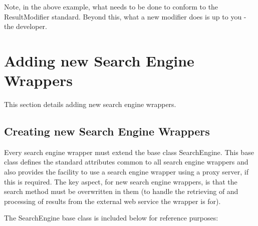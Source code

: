 \documentclass[letterpaper,10pt,english]{sphinxmanual}
\begin{document}
Note, in the above example, what needs to be done to conform to the ResultModifier standard. Beyond this, what a new modifier does is up to you - the developer.


\section{Adding new Search Engine Wrappers}
\label{extendingSearchEngine:extending-the-search-engine}\label{extendingSearchEngine::doc}\label{extendingSearchEngine:adding-new-search-engine-wrappers}
This section details adding new search engine wrappers.


\subsection{Creating new Search Engine Wrappers}
\label{extendingSearchEngine:creating-new-search-engine-wrappers}
Every search engine wrapper must extend the base class SearchEngine. This base class defines the standard attributes common to all search engine wrappers and also provides the facility to use a search engine wrapper using a proxy server, if this is required. The key aspect, for new search engine wrappers, is that the search method must be overwritten in them (to handle the retrieving of and processing of results from the external web service the wrapper is for).

The SearchEngine base class is included below for reference purposes:
\end{document}
